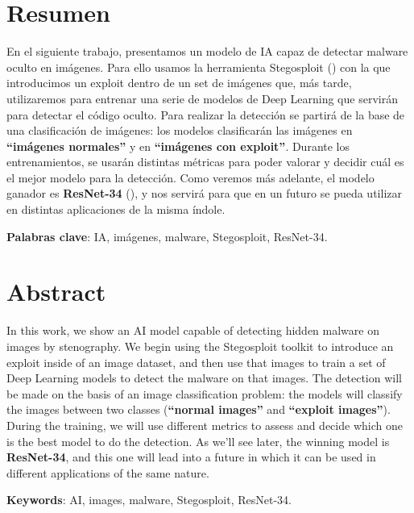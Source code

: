 \chapter{Resumen}

En el siguiente trabajo, presentamos un modelo de \ac{IA} capaz de detectar malware oculto en imágenes. Para ello usamos la herramienta Stegosploit (\cite{stegosploit}) con la que introducimos un exploit dentro de un set de imágenes que, más tarde, utilizaremos para entrenar una serie de modelos de Deep Learning que servirán para detectar el código oculto. Para realizar la detección se partirá de la base de una clasificación de imágenes: los modelos clasificarán las imágenes en \textbf{``imágenes normales''} y en \textbf{``imágenes con exploit''}. Durante los entrenamientos, se usarán distintas métricas para poder valorar y decidir cuál es el mejor modelo para la detección. Como veremos más adelante, el modelo ganador es \textbf{ResNet-34} (\cite{resnet34}), y nos servirá para que en un futuro se pueda utilizar en distintas aplicaciones de la misma índole. %



\vspace{0.5cm}

\textbf{Palabras clave}: \ac{IA}, imágenes, malware, Stegosploit, ResNet-34.

\newpage
\thispagestyle{empty}
\hspace*{0.5cm}
\newpage

\chapter{Abstract}

In this work, we show an AI model capable of detecting hidden malware on images by stenography. We begin using the Stegosploit toolkit to introduce an exploit inside of an image dataset, and then use that images to train a set of Deep Learning models to detect the malware on that images. The detection will be made on the basis of an image classification problem: the models will classify the images between two classes (\textbf{``normal images''} and \textbf{``exploit images''}). During the training, we will use different metrics to assess and decide which one is the best model to do the detection. As we'll see later, the winning model is \textbf{ResNet-34}, and this one will lead into a future in which it can be used in different applications of the same nature.

\vspace{0.5cm}

\textbf{Keywords}: AI, images, malware, Stegosploit, ResNet-34.
\newpage
\thispagestyle{empty}
\hspace*{0.5cm}
\newpage
